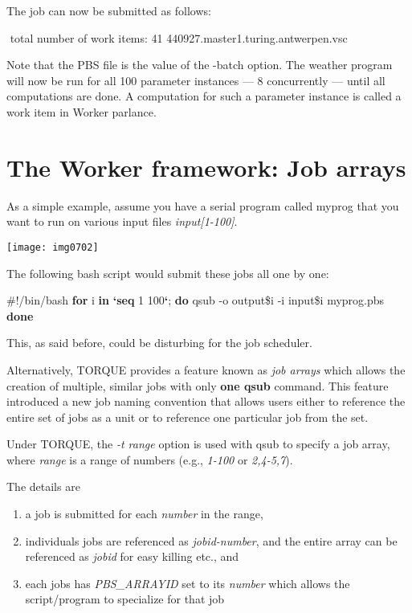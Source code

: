 The job can now be submitted as follows:
\begin{prompt}
$ %
$ %
total number of work items: 41
440927.master1.turing.antwerpen.vsc
\end{prompt}

Note that the PBS file is the value of the -batch option. The weather program will now be run for all 100 parameter instances --- 8 concurrently --- until all computations are done. A computation for such a parameter instance is called a work item in Worker parlance.

\section{The Worker framework: Job arrays}

As a simple example, assume you have a serial program called myprog that you want to run on various input files \textit{input[1-100]}.

\texttt{[image: img0702]}

The following bash script would submit these jobs all one by one:
\begin{prog}
 \#!/bin/bash
 \textbf{for} i \textbf{in} \textbf{`seq} 1 100\textbf{`}; \textbf{do}
     qsub -o output\$i -i input\$i myprog.pbs
 \textbf{done}
\end{prog}

This, as said before, could be disturbing for the job scheduler.

Alternatively, TORQUE provides a feature known as \textit{job arrays} which allows the creation of multiple, similar jobs with only \textbf{one qsub} command. This feature introduced a new job naming convention that allows users either to reference the entire set of jobs as a unit or to reference one particular job from the set.

Under TORQUE, the \textit{-t range} option is used with qsub to specify a job array, where \textit{range} is a range of numbers (e.g., \textit{1-100} or \textit{2,4-5,7}).

The details are

\begin{enumerate}
\item  a job is submitted for each \textit{number} in the range,
\item  individuals jobs are referenced as \textit{jobid-number}, and the entire array can be referenced as \textit{jobid} for easy killing etc., and
\item  each jobs has \textit{PBS\_ARRAYID} set to its \textit{number} which allows the script/program to specialize for that job
\end{enumerate}

